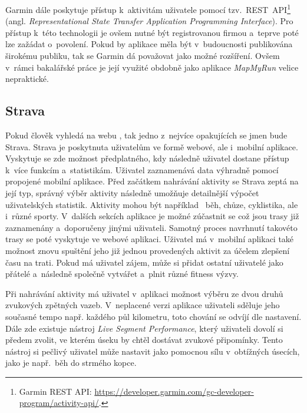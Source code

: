 Garmin dále poskytuje přístup k~aktivitám uživatele pomocí tzv.~REST~API\footnote{Garmin REST API: \url{https://developer.garmin.com/gc-developer-program/activity-api/}.} (angl.
\emph{Representational State Transfer Application Programming Interface}). Pro přístup k~této technologii je ovšem nutné být registrovanou firmou a~teprve poté lze zažádat o~povolení. Pokud by aplikace měla být v~budoucnosti publikována širokému publiku, tak se Garmin dá považovat jako možné rozšíření. Ovšem v~rámci bakalářské práce je její využité obdobně jako aplikace \emph{MapMyRun} velice nepraktické.

\newpage
\subsection{Strava}
\label{strava}
Pokud člověk vyhledá na webu , tak jedno z~nejvíce opakujících se jmen bude Strava. Strava je poskytnuta uživatelům ve formě webové, ale i~mobilní aplikace. Vyskytuje se zde možnost předplatného, kdy následně uživatel dostane přístup k~více funkcím a~statistikám. Uživatel zaznamenává data výhradně pomocí propojené mobilní aplikace. Před začátkem nahrávání aktivity se Strava zeptá na její typ, správný výběr aktivity následně umožňuje detailnější výpočet uživatelských statistik. Aktivity mohou být například ~běh, chůze, cyklistika, ale i~různé sporty. V~dalších sekcích aplikace je možné zúčastnit se 
což jsou trasy již zaznamenány a~doporučeny jinými uživateli. Samotný proces navrhnutí takovéto trasy se poté vyskytuje ve webové aplikaci. Uživatel má v~mobilní aplikaci také možnost znovu spuštění jeho již jednou provedených aktivit za účelem zlepšení času na trati. Pokud má uživatel zájem, může si přidat ostatní uživatelé jako přátelé a~následně společně vytvářet a~plnit různé fitness výzvy. 

Při nahrávání aktivity má uživatel v~aplikaci možnost výběru ze dvou druhů zvukových zpětných vazeb. V~neplacené verzi aplikace uživateli sděluje jeho současné tempo např. každého půl kilometru, toto chování se odvíjí dle nastavení. Dále zde existuje nástroj \emph{Live Segment Performance}, který uživateli dovolí si předem zvolit, ve kterém úseku by chtěl dostávat zvukové připomínky. Tento nástroj si pečlivý uživatel může nastavit jako pomocnou sílu v~obtížných úsecích, jako je např.~běh do strmého kopce.~\cite{stravavsmapmyrun}

